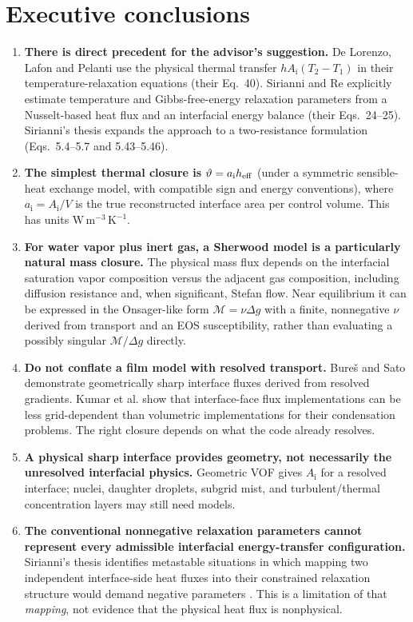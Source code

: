 \documentclass[11pt,letterpaper]{article}
\newcommand{\mi}{\mathrm{i}}
\newcommand{\area}{a_\mi}
\newcommand{\gdiff}{\Delta g}
\newcommand{\mcal}{\mathcal{M}}
\begin{document}
\section{Executive conclusions}
\begin{enumerate}
\item \textbf{There is direct precedent for the advisor's suggestion.} De Lorenzo, Lafon and Pelanti \cite{DeLorenzo2019} use the physical thermal transfer $h A_\mi(T_2-T_1)$ in their temperature-relaxation equations (their Eq.~40). Sirianni and Re \cite{SirianniRe2026} explicitly estimate temperature and Gibbs-free-energy relaxation parameters from a Nusselt-based heat flux and an interfacial energy balance (their Eqs.~24--25). Sirianni's thesis \cite{SirianniThesis2026} expands the approach to a two-resistance formulation (Eqs.~5.4--5.7 and 5.43--5.46).
\item \textbf{The simplest thermal closure is} $\vartheta=\area h_{\rm eff}$ (under a symmetric sensible-heat exchange model, with compatible sign and energy conventions), where $\area=A_\mi/V$ is the true reconstructed interface area per control volume. This has units $\mathrm{W\,m^{-3}\,K^{-1}}$.
\item \textbf{For water vapor plus inert gas, a Sherwood model is a particularly natural mass closure.} The physical mass flux depends on the interfacial saturation vapor composition versus the adjacent gas composition, including diffusion resistance and, when significant, Stefan flow. Near equilibrium it can be expressed in the Onsager-like form $\mcal=\nu\gdiff$ with a finite, nonnegative $\nu$ derived from transport and an EOS susceptibility, rather than evaluating a possibly singular $\mcal/\gdiff$ directly.
\item \textbf{Do not conflate a film model with resolved transport.} Bure\v{s} and Sato \cite{BuresSato2021} demonstrate geometrically sharp interface fluxes derived from resolved gradients. Kumar et al. \cite{VijayaKumar2021} show that interface-face flux implementations can be less grid-dependent than volumetric implementations for their condensation problems. The right closure depends on what the code already resolves.
\item \textbf{A physical sharp interface provides geometry, not necessarily the unresolved interfacial physics.} Geometric VOF gives $A_\mi$ for a resolved interface; nuclei, daughter droplets, subgrid mist, and turbulent/thermal concentration layers may still need models.
\item \textbf{The conventional nonnegative relaxation parameters cannot represent every admissible interfacial energy-transfer configuration.} Sirianni's thesis identifies metastable situations in which mapping two independent interface-side heat fluxes into their constrained relaxation structure would demand negative parameters \cite{SirianniThesis2026}. This is a limitation of that \emph{mapping}, not evidence that the physical heat flux is nonphysical.
\end{enumerate}
\end{document}
